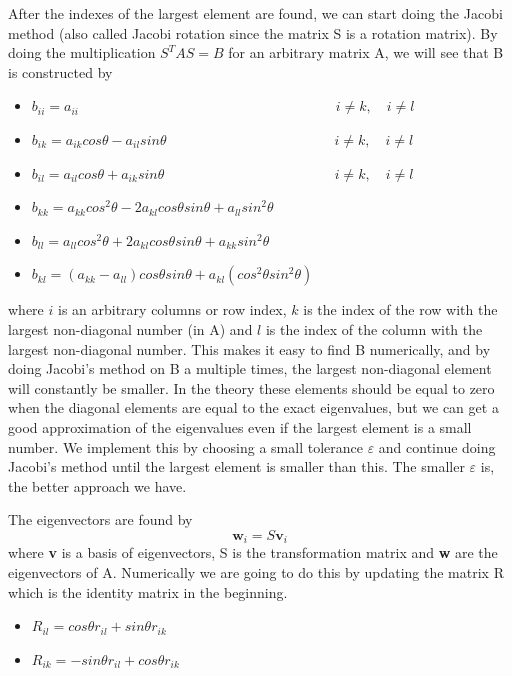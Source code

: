 \documentclass[norsk,a4paper,12pt]{article}
\begin{document}
After the indexes of the largest element are found, we can start doing the Jacobi method (also called Jacobi rotation since the matrix S is a rotation matrix). By doing the multiplication $S^T AS = B$ for an arbitrary matrix A, we will see that B is constructed by
\begin{itemize}
\item $b_{ii}=a_{ii}\quad\quad\quad\quad\quad\quad\quad\quad\quad\quad\quad\quad\quad\quad\quad\quad\quad\quad\,\, i\not=k,\quad i\not= l$
\item $b_{ik}=a_{ik}cos\theta-a_{il}sin\theta\quad\quad\quad\quad\quad\quad\quad\quad\quad\quad\quad\quad i\not=k,\quad i\not= l$
\item $b_{il}=a_{il}cos\theta+a_{ik}sin\theta\quad\quad\quad\quad\quad\quad\quad\quad\quad\quad\quad\quad\, i\not=k,\quad i\not= l$
\item $b_{kk}=a_{kk}cos^2\theta-2a_{kl}cos\theta sin\theta +a_{ll}sin^2\theta$
\item $b_{ll}=a_{ll}cos^2\theta+2a_{kl}cos\theta sin\theta +a_{kk}sin^2\theta$
\item $b_{kl}=(a_{kk}-a_{ll})cos\theta sin\theta + a_{kl}(cos^2\theta sin^2\theta)$
\end{itemize}
where $i$ is an arbitrary columns or row index, $k$ is the index of the row with the largest non-diagonal number (in A) and $l$ is the index of the column with the largest non-diagonal number. This makes it easy to find B numerically, and by doing Jacobi's method on B a multiple times, the largest non-diagonal element will constantly be smaller. In the theory these elements should be equal to zero when the diagonal elements are equal to the exact eigenvalues, but we can get a good approximation of the eigenvalues even if the largest element is a small number. We implement this by choosing a small tolerance $\varepsilon$ and continue doing Jacobi's method until the largest element is smaller than this. The smaller $\varepsilon$ is, the better approach we have.\par\vspace{3mm}
The eigenvectors are found by
\begin{equation}
\textbf{w}_i=S\textbf{v}_i
\end{equation}
where \textbf{v} is a basis of eigenvectors, S is the transformation matrix and \textbf{w} are the eigenvectors of A. Numerically we are going to do this by updating the matrix R which is the identity matrix in the beginning. 
\begin{itemize}
\item $R_{il}=cos\theta r_{il}+sin\theta r_{ik}$
\item $R_{ik}=-sin\theta r_{il}+cos\theta r_{ik}$
\end{itemize}
\end{document}
